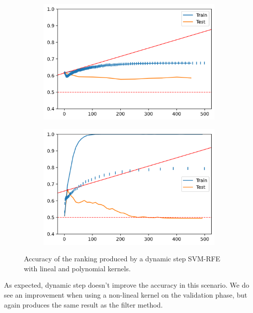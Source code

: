 \begin{figure}[h]
    \centering
    \begin{subfigure}[b]{0.4\linewidth}
        \includegraphics[width=\linewidth]{img/ch5/dstep/madelon-dyn1.png}
    \end{subfigure}
    \begin{subfigure}[b]{0.4\linewidth}
        \includegraphics[width=\linewidth]{img/ch5/dstep/madelon-dyn2.png}
    \end{subfigure}
    \caption[Dynamic step: Madelon with dynamic step]{Accuracy of the ranking produced by a dynamic step SVM-RFE with lineal and polynomial kernels.}
    \label{fig:ch5.dstep.madelon.dyn}
\end{figure}

As expected, dynamic step doesn't improve the accuracy in this scenario. We do see an improvement when using a non-lineal kernel on the validation phase, but again produces the same result as the filter method.

